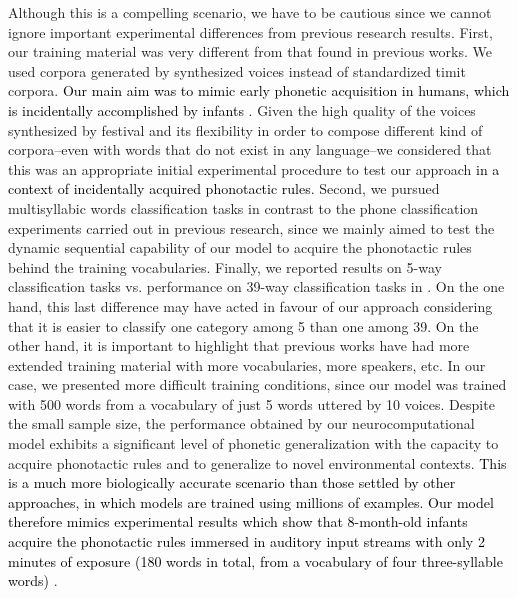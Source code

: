 \documentclass[10pt,letterpaper]{article}
\newcommand{\reviewerfour}[1]{\textcolor{black}{#1}}
\begin{document}
Although this is a compelling scenario, we have to be cautious since we cannot ignore important experimental differences from previous research results. First, our training material was very different from that found in previous works. We used corpora generated by synthesized voices instead of standardized \gls{timit} corpora.
\reviewerfour{Our main aim was to mimic early phonetic acquisition in humans, which is incidentally accomplished by infants \cite{Saffran1996StatisticalLB}}.
Given the high quality of the voices synthesized by \gls{festival} \cite{festival2014} and its flexibility in order to compose different kind of corpora--even with words that do not exist in any language--we considered that this was an appropriate initial experimental procedure to test our approach \reviewerfour{in a context of incidentally acquired phonotactic rules}. 
Second, we pursued multisyllabic words classification tasks in contrast to the phone classification experiments carried out in previous research,
since we mainly aimed to test the dynamic sequential capability of our model to acquire the phonotactic rules behind the training vocabularies. 
Finally, we reported results on 5-way classification tasks vs. performance on 39-way classification tasks in \cite{Lee:2009:UFL:2984093.2984217}. 
On the one hand, this last difference may have acted in favour of our approach considering that it is easier to classify one category among 5 than one among 39.
On the other hand, it is important to highlight that previous works have had more extended training material with more vocabularies, more speakers, etc.
In our case, we presented more difficult training conditions, since our model was trained with 500 words from a vocabulary of just 5 words uttered by 10 voices.
Despite the small sample size, the performance obtained by our neurocomputational model exhibits a significant level of phonetic generalization with the capacity to acquire phonotactic rules and to generalize to novel environmental contexts. \reviewerfour{This is a much more biologically accurate scenario than those settled by other approaches, in which models are trained using millions of examples. Our model therefore mimics experimental results which show that 8-month-old infants  acquire the phonotactic rules immersed in auditory input streams with only 2 minutes of exposure (180 words in total, from a vocabulary of four three-syllable words) \cite{Saffran1996StatisticalLB}}.
\end{document}
